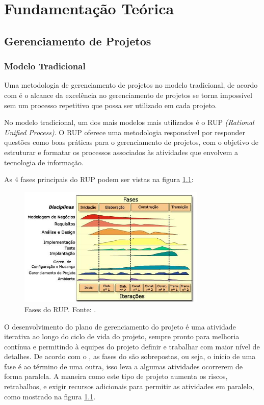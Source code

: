 \chapter[Fundamentação Teórica]{Fundamentação Teórica}
\label{cp:fundamentacao}

\section{Gerenciamento de Projetos}
\label{sec:gerenciamento_de_projetos}

\subsection{Modelo Tradicional}
\label{sec:modelo_tradicional}

Uma metodologia de gerenciamento de projetos no modelo tradicional, de acordo com \cite{kerzner} é o alcance da excelência no gerenciamento de projetos se torna impossível sem um processo repetitivo que possa ser utilizado em cada projeto.

No modelo tradicional, um dos mais modelos mais utilizados é o RUP \textit{(Rational Unified Process)}. O RUP oferece uma metodologia responsável por responder questões como boas práticas para o gerenciamento de projetos, com o objetivo de estruturar e formatar os processos associados às atividades que envolvem a tecnologia de informação. 

As 4 fases principais do RUP podem ser vistas na figura \ref{img:fases_do_rup}:

\begin{figure}[H]
	\centering
	\includegraphics[width=0.8\textwidth]{figuras/fases_rup.jpg}
	\caption{Fases do RUP. Fonte: \cite{rup}.}
	\label{img:fases_do_rup}
\end{figure}

O desenvolvimento do plano de gerenciamento do projeto é uma atividade iterativa ao longo do ciclo de vida do projeto, sempre pronto para melhoria contínua e permitindo à equipes do projeto definir e trabalhar com maior nível de detalhes. De acordo com o \cite{pmbok}, as fases do \cite{rup} são sobrepostas, ou seja, o início de uma fase é ao término de uma outra, isso leva a algumas atividades ocorrerem de forma paralela. A maneira como este tipo de projeto aumenta os riscos, retrabalhos, e exigir recursos adicionais para permitir as atividades em paralelo, como mostrado na figura \ref{img:fases_do_rup}.


